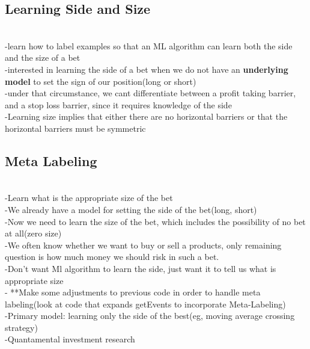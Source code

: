\documentclass{article}
\begin{document}
\subsection{Learning Side and Size}\\ 
-learn how to label examples so that an ML algorithm can learn both the side and the size of a bet\\ 
	\indent-interested in learning the side of a bet when we do not have an \textbf{underlying model} to set the sign of our position(long or short)\\ 
-under that circumstance, we cant differentiate between a profit taking barrier, and a stop loss barrier, since it requires knowledge of the side\\ 
-Learning size implies that either there are no horizontal barriers or that the horizontal barriers must be symmetric\\ 

\subsection{Meta Labeling}\\ 
-Learn what is the appropriate size of the bet \\ 
		\indent-We already have a model for setting the side of the bet(long, short)\\ 
       	\indent-Now we need to learn the size of the bet, which includes the possibility 			of no bet at all(zero size)\\ 
       \indent -We often know whether we want to buy or sell a products, only 						remaining question is how much money we should risk in such a bet.\\ 
        \indent-Don't want Ml algorithm to learn the side, just want it to tell us what is 			appropriate size\\ 
- **Make some adjustments to previous code in order to handle meta labeling(look at code that expands getEvents to incorporate Meta-Labeling)\\ 
-Primary model: learning only the side of the best(eg, moving average crossing strategy)\\ 
-Quantamental investment research\\ 
\end{document}
